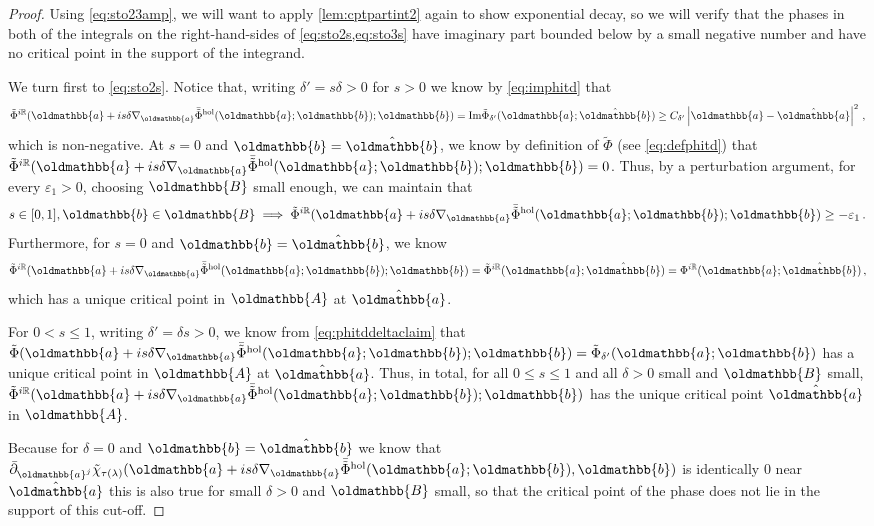 \documentclass[
	fontsize=11pt, 
	twoside=false, 
	abstract=true, 
	a4paper,
]{scrartcl}
\newcommand{\eps}{\varepsilon}
\newcommand{\RR}{\mathbb{R}}
\newcommand{\abs}[1]{\left\lvert#1\right\rvert}
\newcommand{\del}{\partial}
\newcommand{\td}[1]{\tilde{#1}}
\newcommand{\mf}[1]{\oldmathbb{#1}}
\begin{document}
\begin{proof}
	Using \cref{eq:sto23amp}, we will want to apply \cref{lem:cptpartint2} again to show exponential decay, so we will verify that the phases in both of the integrals on the right-hand-sides of \cref{eq:sto2s,eq:sto3s} have imaginary part bounded below by a small negative number and have no critical point in the support of the integrand.
	
	We turn first to \cref{eq:sto2s}.
	Notice that, writing $\delta' = s\delta > 0$ for $s>0$ we know by 
	\cref{eq:imphitd} that
	\[
		\td{\Phi}^{i\RR}(\mf{a}+is\delta\nabla_{\mf{a}}\bar{\td{\Phi}}^{\mathrm{hol}}(\mf{a};\mf{b});\mf{b}) = \mathrm{Im}\td{\Phi}_{\delta'}(\mf{a};\hat{\mf{b}}) \geq C_{\delta'}\abs{\mf{a}-\hat{\mf{a}}}^2\,,
	\]
	which is non-negative. At $s=0$ and $\mf{b}=\hat{\mf{b}}$, we know by definition of $\td{\Phi}$ (see \cref{eq:defphitd}) that $\td{\Phi}^{i\RR}(\mf{a}+is\delta\nabla_{\mf{a}}\bar{\td{\Phi}}^{\mathrm{hol}}(\mf{a};\mf{b});\mf{b}) = 0$. Thus, by a perturbation argument, for every $\eps_1 > 0$, choosing $\mf{B}$ small enough, we can maintain that
	\[
		s\in[0,1],\mf{b}\in\mf{B}\implies \td{\Phi}^{i\RR}(\mf{a}+is\delta\nabla_{\mf{a}}\bar{\td{\Phi}}^{\mathrm{hol}}(\mf{a};\mf{b});\mf{b}) \geq -\eps_1\,.
	\]
	Furthermore, for $s=0$ and $\mf{b}=\hat{\mf{b}}$, we know
	\[
		\td{\Phi}^{i\RR}(\mf{a}+is\delta\nabla_{\mf{a}}\bar{\td{\Phi}}^{\mathrm{hol}}(\mf{a};\mf{b});\mf{b}) =	\td{\Phi}^{i\RR}(\mf{a};\hat{\mf{b}}) =  \Phi^{i\RR}(\mf{a};\hat{\mf{b}})\,,
	\]
	which has a unique critical point in $\mf{A}$ at $\hat{\mf{a}}$. 

	For $0<s\leq 1$, writing $\delta' = \delta s> 0$, we know from
	\cref{eq:phitddeltaclaim} that $\td{\Phi}(\mf{a}+is\delta\nabla_{\mf{a}}\bar{\td{\Phi}}^{\mathrm{hol}}(\mf{a};\mf{b});\mf{b}) = \td{\Phi}_{\delta'}(\mf{a};\mf{b})$ has a unique critical point in $\mf{A}$ at $\hat{\mf{a}}$. Thus, in total, for all $0\leq s\leq 1$ and all $\delta>0$ small and $\mf{B}$ small, $\td{\Phi}^{i\RR}(\mf{a}+is\delta\nabla_{\mf{a}}\bar{\td{\Phi}}^{\mathrm{hol}}(\mf{a};\mf{b});\mf{b})$ has the unique critical point $\hat{\mf{a}}$ in $\mf{A}$.

	Because for $\delta = 0$ and $\mf{b}=\hat{\mf{b}}$ we know that $\bar\del_{\mf{a}^j}\td{\chi}_{\tau(\lambda)}(\mf{a}+is\delta\nabla_{\mf{a}}\bar{\td{\Phi}}^{\mathrm{hol}}(\mf{a};\mf{b}),\mf{b})$ is identically $0$ near $\hat{\mf{a}}$ this is also true for small $\delta > 0$ and $\mf{B}$ small, so that the critical point of the phase does not lie in the support of this cut-off.


\end{proof}
\end{document}
